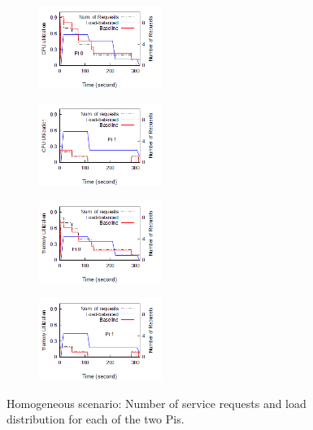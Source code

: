 \documentclass[conference]{IEEEtran}
\begin{document}
\begin{figure}[!htb]
    \centering
    \begin{subfigure}{\linewidth}
        \centering
        \includegraphics[clip, trim=0.0cm 1.3cm 0cm 0cm, width=4cm]{figures/same-cpu-edge0.png}
    \end{subfigure}
    \begin{subfigure}{\linewidth}
        \centering
        \includegraphics[clip, trim=0.0cm 1.3cm 0cm 0cm, width=4cm]{figures/same-cpu-edge1.png}
    \end{subfigure}	
    \centering
    \begin{subfigure}{\linewidth}
        \centering
        \includegraphics[clip, width=4cm]{figures/same-mem-edge0.png}
    \end{subfigure}
    \begin{subfigure}{\linewidth}
        \centering
        \includegraphics[clip, width=4cm]{figures/same-mem-edge1.png}
    \end{subfigure}	
    \caption{Homogeneous scenario: Number of service requests and load distribution for each of the two Pis.}
    \label{fig:homLoad}
\end{figure}
\end{document}
